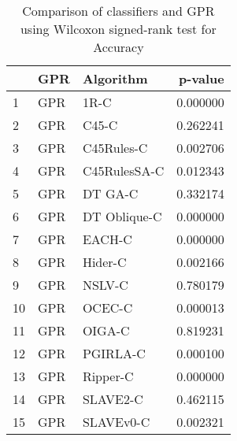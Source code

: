 \begin{table}
\footnotesize
\caption{Comparison of classifiers and GPR using Wilcoxon signed-rank test for Accuracy}
\label{tab:GPR wilcoxon Accuracy comparison}
\begin{tabular}{lllr}
\hline
 & GPR & Algorithm & p-value \\
\hline
1 & GPR & 1R-C & 0.000000 \\
2 & GPR & C45-C & 0.262241 \\
3 & GPR & C45Rules-C & 0.002706 \\
4 & GPR & C45RulesSA-C & 0.012343 \\
5 & GPR & DT GA-C & 0.332174 \\
6 & GPR & DT Oblique-C & 0.000000 \\
7 & GPR & EACH-C & 0.000000 \\
8 & GPR & Hider-C & 0.002166 \\
9 & GPR & NSLV-C & 0.780179 \\
10 & GPR & OCEC-C & 0.000013 \\
11 & GPR & OIGA-C & 0.819231 \\
12 & GPR & PGIRLA-C & 0.000100 \\
13 & GPR & Ripper-C & 0.000000 \\
14 & GPR & SLAVE2-C & 0.462115 \\
15 & GPR & SLAVEv0-C & 0.002321 \\
\hline
\end{tabular}
\end{table}
